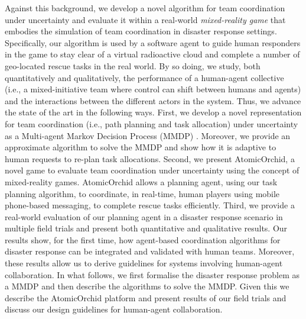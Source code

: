 Against this background, we develop a novel algorithm for team coordination under uncertainty and evaluate it within a real-world \emph{mixed-reality game} \cite{Fischer:etal:2012} that embodies the simulation of team coordination in disaster response settings. Specifically, our algorithm is used by a software agent to guide human responders in the game to stay clear of a virtual radioactive cloud and complete a number of geo-located rescue tasks in the real world. By so doing, we  study, both quantitatively and qualitatively, the performance of a human-agent collective (i.e., a mixed-initiative team where control can shift between humans and agents)  and the interactions between the different actors in the system. Thus, we  advance the state of the art in the following ways. First, we develop a novel representation for team coordination (i.e., path planning and task allocation) under uncertainty as a Multi-agent Markov Decision Process (MMDP)  \cite{boutilier1996planning}. Moreover, we provide an approximate algorithm to solve the MMDP and show how it  is adaptive to human requests to re-plan task allocations. Second, we present AtomicOrchid, a novel game to evaluate team coordination under uncertainty using the concept of mixed-reality games. AtomicOrchid allows a planning agent, using our task planning algorithm, to coordinate, in real-time, human players using mobile phone-based messaging, to complete rescue tasks efficiently. Third, we provide a real-world evaluation of our planning agent in a disaster response scenario in multiple field trials and present both quantitative and qualitative results. 
Our results show, for the first time, how agent-based coordination algorithms for disaster response can be integrated and validated with human teams. Moreover, these results allow us to derive  guidelines for systems involving  human-agent collaboration.  In what follows, we first formalise the disaster response problem as a MMDP and then describe the algorithms to solve the MMDP. Given this we describe the AtomicOrchid platform and present results of our field trials and discuss our design guidelines for human-agent collaboration.\vspace{-2mm}





